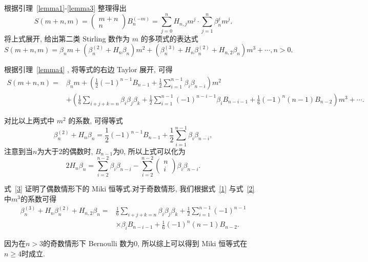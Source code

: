\documentclass{CombPaper}
\begin{document}
根据引理~\ref{lemma1}-\ref{lemma3} 整理得出
\begin{equation}
S(m+n, m)=\left(\begin{array}{c}
m+n \\
n
\end{array}\right)B_{n}^{(-m)}=\sum_{j=0}^{n}H_{n, j}m^{j}\cdot \sum_{j=1}^{n}\beta_{n}^{j}m^{j}.
\end{equation}
将上式展开, 给出第二类 Stirling 数作为 $m$ 的多项式的表达式 
\begin{equation}\label{1}
S(m+n,  m)=\beta_{n} m+\left(\beta_{n}^{(2)}+H_{n} \beta_{n}\right) m^{2}+\left(\beta_{n}^{(3)}+H_{n} \beta_{n}^{(2)}+H_{n,  2} \beta_{n}\right) m^{3}+\cdots,  n>0.    
\end{equation}\par
根据引理~\ref{lemma4} , 将等式的右边 Taylor 展开, 可得
\begin{equation}\label{2}
\begin{aligned}
S(m+n,  n)=& \beta_{n} m+\left(\frac{1}{2}(-1)^{n-1} B_{n-1}+\frac{1}{2} \sum_{i=1}^{n-1} \beta_{i} \beta_{n-i}\right) m^{2} \\
&+\left(\frac{1}{6} \sum_{i+j+k=n} \beta_{i} \beta_{j} \beta_{k}+\frac{1}{2} \sum_{i=1}^{n-1}(-1)^{n-i-1} \beta_{i} B_{n-i-1}+\frac{1}{6}(-1)^{n}(n-1) B_{n-2}\right) m^{3}+\cdots.
\end{aligned}
\end{equation}\par
对比以上两式中 $m^{2}$ 的系数, 可得等式
\begin{equation}
\beta_{n}^{(2)}+H_{n} \beta_{n}=\frac{1}{2}(-1)^{n-1} B_{n-1}+\frac{1}{2} \sum_{i=1}^{n-1} \beta_{i} \beta_{n-i},     
\end{equation}
注意到当$n$为大于2的偶数时, $B_{n-1}$为0, 所以上式可以化为
\begin{equation}\label{3}
    2 H_{n} \beta_{n}=\sum_{i=2}^{n-2} \beta_{i} \beta_{n-i}-\sum_{i=2}^{n-2}\left(\begin{array}{c}
n \\
i
\end{array}\right) \beta_{i} \beta_{n-i}.
\end{equation}\par
式~\eqref{3} 证明了偶数情形下的 Miki 恒等式.对于奇数情形, 我们根据式~\eqref{1} 与式~\eqref{2} 中$m^{3}$的系数可得
\begin{equation}
    \begin{aligned}
\beta_{n}^{(3)}+H_{n} \beta_{n}^{(2)}+H_{n,  2} \beta_{n}=& \frac{1}{6} \sum_{i+j+k=n} \beta_{i} \beta_{j} \beta_{k}+\frac{1}{2} \sum_{i=1}^{n-1}(-1)^{n-1} \\
& \times \beta_{i} B_{n-i-1}+\frac{1}{6}(-1)^{n}(n-1) B_{n-2} .
\end{aligned}
\end{equation}\par
因为在$n>3$的奇数情形下 Bernoulli 数为0, 所以综上可以得到 Miki 恒等式在$n\geq 4$时成立.
\end{document}
